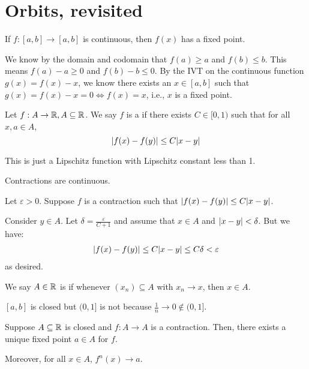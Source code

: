 \documentclass[class=pmath370,tikz,notes]{agony}
\begin{document}
\section{Orbits, revisited}

\begin{prop}
  If $f : [a,b] \to [a,b]$ is continuous, then $f(x)$ has a fixed point.
\end{prop}
\begin{prf}
  We know by the domain and codomain that $f(a) \geq a$ and $f(b) \leq b$.
  This means $f(a) - a \geq 0$ and $f(b) - b \leq 0$.
  By the IVT on the continuous function $g(x) = f(x) - x$,
  we know there exists an $x \in [a,b]$ such that $g(x) = f(x) - x = 0 \iff f(x) = x$,
  i.e., $x$ is a fixed point.
\end{prf}

\begin{defn*}[contraction]
  Let $f : A \to \mathbb{R}, A \subseteq \mathbb{R}$.
  We say $f$ is a  if there exists $C \in [0,1)$
  such that for all $x,a \in A$,
  \[ \abs{f(x) - f(y)} \leq C\abs{x-y} \]
\end{defn*}

This is just a Lipschitz function with Lipschitz constant less than 1.

\begin{prop}\label{prop:cont-cts}
  Contractions are continuous.
\end{prop}
\begin{prf}
  Let $\varepsilon > 0$.
  Suppose $f$ is a contraction such that $\abs{f(x) - f(y)} \leq C\abs{x-y}$.

  Consider $y \in A$.
  Let $\delta = \frac{\varepsilon}{C+1}$
  and assume that $x \in A$ and $\abs{x-y} < \delta$.
  But we have:
  \begin{align*}
    \abs{f(x) - f(y)} \leq C\abs{x-y} \leq C\delta < \varepsilon
  \end{align*}
  as desired.
\end{prf}

\begin{defn*}
  We say $A \in \mathbb{R}$ is 
  if whenever $(x_n) \subseteq A$ with $x_n \to x$,
  then $x \in A$.
\end{defn*}

\begin{example}
  $[a,b]$ is closed but $(0,1]$ is not because $\frac1n \to 0 \not\in (0,1]$.
\end{example}

\begin{theorem}\label{thm:banach}
  Suppose $A \subseteq \mathbb{R}$ is closed and $f : A \to A$ is a contraction.
  Then, there exists a unique fixed point $a \in A$ for $f$.

  Moreover, for all $x \in A$, $f^n(x) \to a$.
\end{theorem}
\end{document}
